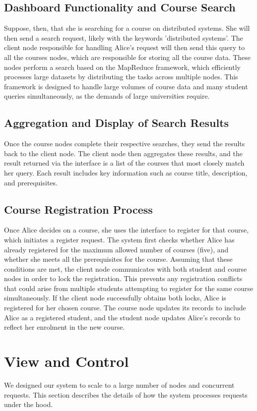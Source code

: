 \documentclass[sigplan, screen, 10pt]{acmart}
\begin{document}
\subsection{Dashboard Functionality and Course Search}
Suppose, then, that she is searching for a course on distributed systems. She will then send a search request, likely with the keywords 'distributed systems'. The client node responsible for handling Alice's request will then send this query to all the courses nodes, which are responsible for storing all the course data. These nodes perform a search based on the MapReduce framework, which efficiently processes large datasets by distributing the tasks across multiple nodes. This framework is designed to handle large volumes of course data and many student queries simultaneously, as the demands of large universities require.

\subsection{Aggregation and Display of Search Results}
Once the course nodes complete their respective searches, they send the results back to the client node. The client node then aggregates these results, and the result returned via the interface is a list of the courses that most closely match her query. Each result includes key information such as course title, description, and prerequisites.

\subsection{Course Registration Process}
Once Alice decides on a course, she uses the interface to register for that course, which initiates a register request. The system first checks whether Alice has already registered for the maximum allowed number of courses (five), and whether she meets all the prerequisites for the course. Assuming that these conditions are met, the client node communicates with both student and course nodes in order to lock the registration. This prevents any registration conflicts that could arise from multiple students attempting to register for the same course simultaneously. If the client node successfully obtains both locks, Alice is registered for her chosen course. The course node updates its records to include Alice as a registered student, and the student node updates Alice's records to reflect her enrolment in the new course.

\section{View and Control}
We designed our system to scale to a large number of nodes and concurrent requests. This section describes the details of how the system processes requests under the hood.
\end{document}
